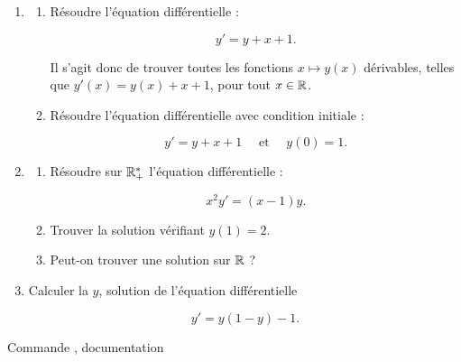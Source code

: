 \begin{frame}

\begin{tp}
\begin{enumerate}
  \item 
  \begin{enumerate}
    \item Résoudre l'équation différentielle :
    
  \vspace*{-2ex}  
  $$y' = y + x + 1.$$
  \vspace*{-3ex} 
  
  Il s'agit donc de trouver toutes les fonctions $x\mapsto y(x)$ dérivables, telles que
  $y'(x) = y(x) + x + 1$, pour tout $x\in \mathbb{R}$.
    
    \item Résoudre l'équation différentielle avec condition initiale :
    
  \vspace*{-2ex}   
  $$y' = y + x + 1 \quad \text{ et } \quad y(0)=1.$$
  \vspace*{-3ex}
  
  \end{enumerate}
  
  

  \item 
  \begin{enumerate}
    \item
    Résoudre sur $\mathbb{R}_+^*$ l'équation différentielle :
    
    \vspace*{-2ex}
    $$x^2y' = (x-1)y.$$ 
    \vspace*{-3ex}
    
    \item Trouver la solution vérifiant $y(1)=2$.
    
    \item Peut-on trouver une solution sur $\mathbb{R}$ ?
  \end{enumerate}
    
  \item Calculer la  $y$, solution
  de l'équation différentielle 
  
  \vspace*{-2ex}
  $$y'= y(1-y) - 1.$$       
\end{enumerate}
\end{tp}

\pause

Commande , documentation 


\end{frame}



